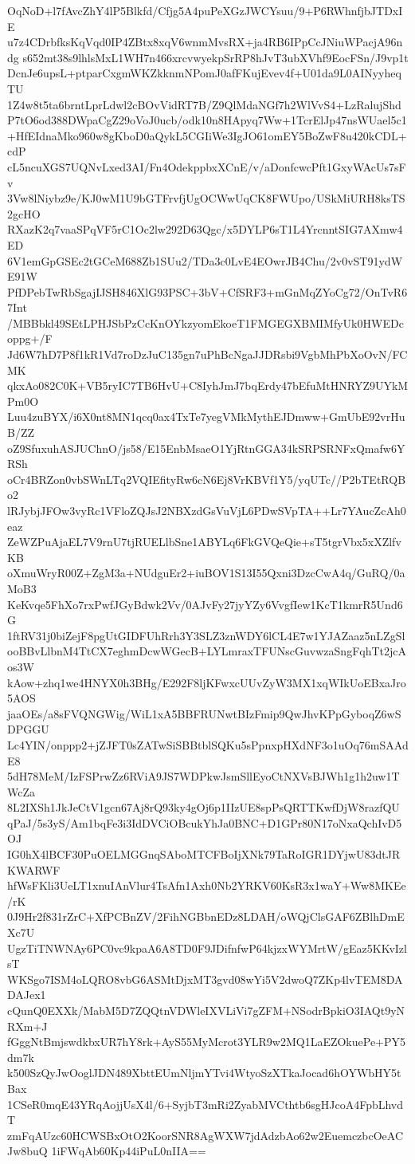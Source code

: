 OqNoD+l7fAvcZhY4lP5Blkfd/Cfjg5A4puPeXGzJWCYsuu/9+P6RWhnfjbJTDxIE
u7z4CDrbfksKqVqd0IP4ZBtx8xqV6wnmMvsRX+ja4RB6IPpCcJNiuWPacjA96ndg
s652mt38s9lhlsMxL1WH7n466xrcvwyekpSrRP8hJvT3ubXVhf9EocFSn/J9vp1t
DcnJe6upsL+ptparCxgmWKZkknmNPomJ0afFKujEvev4f+U01da9L0AINyyheqTU
1Z4w8t5ta6brntLprLdwl2cBOvVidRT7B/Z9QlMdaNGf7h2WlVvS4+LzRalujShd
P7tO6od388DWpaCgZ29oVoJ0ucb/odk10n8HApyq7Ww+1TcrElJp47nsWUael5c1
+HfEIdnaMko960w8gKboD0aQykL5CGIiWe3IgJO61omEY5BoZwF8u420kCDL+cdP
cL5ncuXGS7UQNvLxed3AI/Fn4OdekppbxXCnE/v/aDonfcwcPft1GxyWAcUs7sFv
3Vw8lNiybz9e/KJ0wM1U9bGTFrvfjUgOCWwUqCK8FWUpo/USkMiURH8ksTS2gcHO
RXazK2q7vaaSPqVF5rC1Oc2lw292D63Qgc/x5DYLP6sT1L4YrcnntSIG7AXmw4ED
6V1emGpGSEc2tGCeM688Zb1SUu2/TDa3c0LvE4EOwrJB4Chu/2v0vST91ydWE91W
PfDPebTwRbSgajIJSH846XlG93PSC+3bV+CfSRF3+mGnMqZYoCg72/OnTvR67Int
/MBBbkl49SEtLPHJSbPzCcKnOYkzyomEkoeT1FMGEGXBMIMfyUk0HWEDcoppg+/F
Jd6W7hD7P8f1kR1Vd7roDzJuC135gn7uPhBcNgaJJDRsbi9VgbMhPbXoOvN/FCMK
qkxAo082C0K+VB5ryIC7TB6HvU+C8IyhJmJ7bqErdy47bEfuMtHNRYZ9UYkMPm0O
Luu4zuBYX/i6X0nt8MN1qcq0ax4TxTe7yegVMkMythEJDmww+GmUbE92vrHuB/ZZ
oZ9SfuxuhASJUChnO/js58/E15EnbMsaeO1YjRtnGGA34kSRPSRNFxQmafw6YRSh
oCr4BRZon0vbSWnLTq2VQIEfityRw6cN6Ej8VrKBVf1Y5/yqUTc//P2bTEtRQBo2
lRJybjJFOw3vyRc1VFloZQJsJ2NBXzdGsVuVjL6PDwSVpTA++Lr7YAucZcAh0eaz
ZeWZPuAjaEL7V9rnU7tjRUELlbSne1ABYLq6FkGVQeQie+sT5tgrVbx5xXZlfvKB
oXmuWryR00Z+ZgM3a+NUdguEr2+iuBOV1S13I55Qxni3DzcCwA4q/GuRQ/0aMoB3
KeKvqe5FhXo7rxPwfJGyBdwk2Vv/0AJvFy27jyYZy6VvgfIew1KcT1kmrR5Und6G
1ftRV31j0biZejF8pgUtGIDFUhRrh3Y3SLZ3znWDY6lCL4E7w1YJAZaaz5nLZgSl
ooBBvLlbnM4TtCX7eghmDcwWGecB+LYLmraxTFUNscGuvwzaSngFqhTt2jcAos3W
kAow+zhq1we4HNYX0h3BHg/E292F8ljKFwxcUUvZyW3MX1xqWIkUoEBxaJro5AOS
jaaOEs/a8sFVQNGWig/WiL1xA5BBFRUNwtBIzFmip9QwJhvKPpGyboqZ6wSDPGGU
Lc4YIN/onppp2+jZJFT0sZATwSiSBBtblSQKu5sPpnxpHXdNF3o1uOq76mSAAdE8
5dH78MeM/IzFSPrwZz6RViA9JS7WDPkwJsmSllEyoCtNXVsBJWh1g1h2uw1TWcZa
8L2IXSh1JkJeCtV1gcn67Aj8rQ93ky4gOj6p1IIzUE8spPsQRTTKwfDjW8razfQU
qPaJ/5s3yS/Am1bqFe3i3IdDVCiOBcukYhJa0BNC+D1GPr80N17oNxaQchIvD5OJ
IG0hX4lBCF30PuOELMGGnqSAboMTCFBoIjXNk79TaRoIGR1DYjwU83dtJRKWARWF
hfWsFKli3UeLT1xnuIAnVlur4TsAfn1Axh0Nb2YRKV60KsR3x1waY+Ww8MKEe/rK
0J9Hr2f831rZrC+XfPCBnZV/2FihNGBbnEDz8LDAH/oWQjClsGAF6ZBlhDmEXc7U
UgzTiTNWNAy6PC0vc9kpaA6A8TD0F9JDifnfwP64kjzxWYMrtW/gEaz5KKvIzlsT
WKSgo7ISM4oLQRO8vbG6ASMtDjxMT3gvd08wYi5V2dwoQ7ZKp4lvTEM8DADAJex1
cQunQ0EXXk/MabM5D7ZQQtnVDWleIXVLiVi7gZFM+NSodrBpkiO3IAQt9yNRXm+J
fGggNtBmjswdkbxUR7hY8rk+AyS55MyMcrot3YLR9w2MQ1LaEZOkuePe+PY5dm7k
k500SzQyJwOoglJDN489XbttEUmNljmYTvi4WtyoSzXTkaJocad6hOYWbHY5tBax
1CSeR0mqE43YRqAojjUsX4l/6+SyjbT3mRi2ZyabMVCthtb6sgHJcoA4FpbLhvdT
zmFqAUzc60HCWSBxOtO2KoorSNR8AgWXW7jdAdzbAo62w2EuemczbcOeACJw8buQ
1iFWqAb60Kp44iPuL0nIIA==

